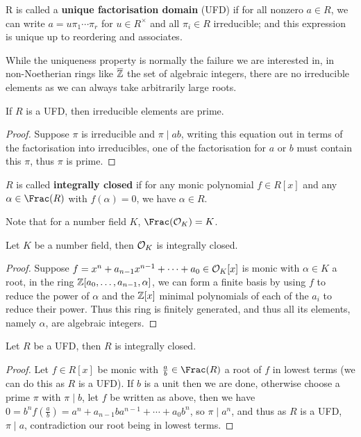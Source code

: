 \documentclass{article}
\begin{document}
\begin{definition}
    R is called a \textbf{unique factorisation domain} (UFD) if for all nonzero $a\in R$, we can write $a=u\pi_1\cdots\pi_r$ for $u\in R^\times $ and all $\pi_i\in R$ irreducible; and this expression is unique up to reordering and associates.
\end{definition}

While the uniqueness property is normally the failure we are interested in, in non-Noetherian rings like $\overline{\mathbb{Z}}$ the set of algebraic integers, there are no irreducible elements as we can always take arbitrarily large roots.

\begin{proposition}
    If $R$ is a UFD, then irreducible elements are prime.
    \begin{proof}
        Suppose $\pi$ is irreducible and $\pi\mid ab$, writing this equation out in terms of the factorisation into irreducibles, one of the factorisation for $a$ or $b$ must contain this $\pi$, thus $\pi$ is prime.
    \end{proof}
\end{proposition}

\begin{definition}
    $R$ is called \textbf{integrally closed} if for any monic polynomial $f\in R[x]$ and any $\alpha\in \Frac(R)$ with $f(\alpha)=0$, we have $\alpha\in R$.
\end{definition}

Note that for a number field $K$, $\Frac(\cO_K)=K$.

\begin{proposition}
    Let $K$ be a number field, then $\mathcal{O}_K$ is integrally closed.
    \begin{proof}
        Suppose $f=x^n + a_{n-1}x^{n-1} + \cdots + a_0\in\mathcal{O}_K[x]$ is monic with $\alpha\in K$ a root, in the ring $\mathbb{Z}[a_0,\ldots,a_{n-1},\alpha]$, we can form a finite basis by using $f$ to reduce the power of $\alpha$ and the $\mathbb{Z}[x]$ minimal polynomials of each of the $a_i$ to reduce their power. Thus this ring is finitely generated, and thus all its elements, namely $\alpha$, are algebraic integers.
    \end{proof}
\end{proposition}

\begin{proposition}
    Let $R$ be a UFD, then $R$ is integrally closed.
    \begin{proof}
        Let $f\in R[x]$ be monic with $\frac{a}{b}\in\Frac(R)$ a root of $f$ in lowest terms (we can do this as $R$ is a UFD). If $b$ is a unit then we are done, otherwise choose a prime $\pi$ with $\pi\mid b$, let $f$ be written as above, then we have $0=b^nf(\frac{a}{b}) = a^n + a_{n-1}ba^{n-1} + \cdots + a_0b^n$, so $\pi\mid a^n$, and thus as $R$ is a UFD, $\pi\mid a$, contradiction our root being in lowest terms.
    \end{proof}
\end{proposition}
\end{document}

